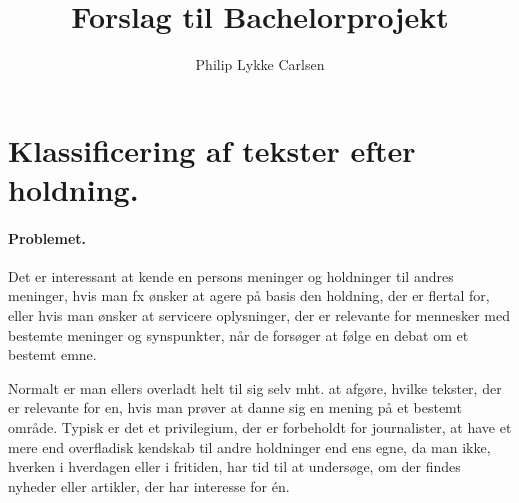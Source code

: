 \documentclass[a4paper,draft]{article}
\title{Forslag til Bachelorprojekt}
\author{Philip Lykke Carlsen}
\begin{document}
\maketitle
\section{Klassificering af tekster efter holdning.}

\paragraph{Problemet.}  Det er interessant at kende en persons meninger og
holdninger til andres meninger, hvis man fx ønsker at agere på basis den
holdning, der er flertal for, eller hvis man ønsker at servicere oplysninger,
der er relevante for mennesker med bestemte meninger og synspunkter, når de
forsøger at følge en debat om et bestemt emne.

Normalt er man ellers overladt helt til sig selv mht. at afgøre, hvilke
tekster, der er relevante for en, hvis man prøver at danne sig en mening på et
bestemt område. Typisk er det et privilegium, der er forbeholdt for
journalister, at have et mere end overfladisk kendskab til andre holdninger end
ens egne, da man ikke, hverken i hverdagen eller i fritiden, har tid til at
undersøge, om der findes nyheder eller artikler, der har interesse for én.  
\end{document}
